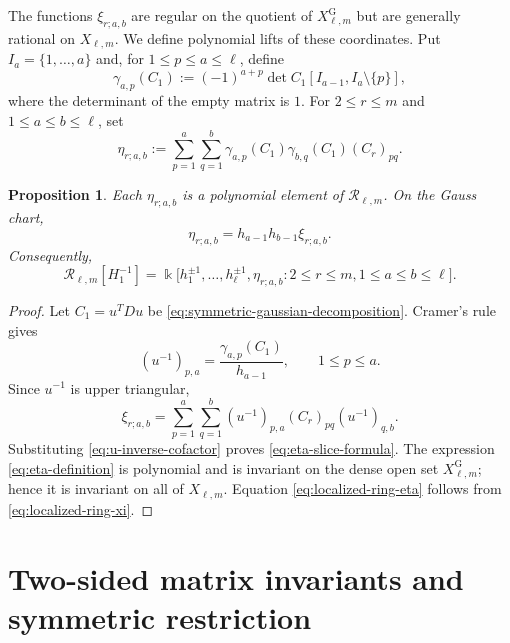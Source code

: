 \documentclass[11pt]{amsart}
\newtheorem{proposition}[theorem]{Proposition}
\theoremstyle{definition}
\theoremstyle{remark}
\newcommand{\kk}{\Bbbk}
\newcommand{\cR}{\mathcal R}
\begin{document}
The functions $\xi_{r;a,b}$ are regular on the quotient of
$X_{\ell,m}^{\mathrm G}$ but are generally rational on $X_{\ell,m}$.  We
define polynomial lifts of these coordinates.  Put $I_a=\{1,\ldots,a\}$ and, for
$1\le p\le a\le\ell$, define
\[ \gamma_{a,p}(C_1) :=(-1)^{a+p}\det C_1[I_{a-1},I_a\setminus\{p\}], \]
where the determinant of the empty matrix is $1$.  For
$2\le r\le m$ and $1\le a\le b\le\ell$, set
\begin{equation}
 \eta_{r;a,b}
 :=\sum_{p=1}^a\sum_{q=1}^b
 \gamma_{a,p}(C_1)\gamma_{b,q}(C_1)(C_r)_{pq}.
 \label{eq:eta-definition}
\end{equation}

\begin{proposition}
\label{prop:eta-gaussian-coordinate}
Each $\eta_{r;a,b}$ is a polynomial element of $\cR_{\ell,m}$.  On the
Gauss chart,
\begin{equation}
 \eta_{r;a,b}=h_{a-1}h_{b-1}\xi_{r;a,b}.
 \label{eq:eta-slice-formula}
\end{equation}
Consequently,
\begin{equation}
 \cR_{\ell,m}[H_1^{-1}]
 =\kk\bigl[
 h_1^{\pm1},\ldots,h_\ell^{\pm1},
 \eta_{r;a,b}:2\le r\le m,
 1\le a\le b\le\ell
 \bigr].
 \label{eq:localized-ring-eta}
\end{equation}
\end{proposition}

\begin{proof}
Let $C_1=u^TDu$ be \eqref{eq:symmetric-gaussian-decomposition}.  Cramer's
rule gives
\begin{equation}
 (u^{-1})_{p,a}=\frac{\gamma_{a,p}(C_1)}{h_{a-1}},
 \qquad 1\le p\le a.
 \label{eq:u-inverse-cofactor}
\end{equation}
Since $u^{-1}$ is upper triangular,
\[ \xi_{r;a,b} =\sum_{p=1}^a\sum_{q=1}^b (u^{-1})_{p,a}(C_r)_{pq}(u^{-1})_{q,b}. \]
Substituting \eqref{eq:u-inverse-cofactor} proves
\eqref{eq:eta-slice-formula}.  The expression
\eqref{eq:eta-definition} is polynomial and is invariant on the dense open
set $X_{\ell,m}^{\mathrm G}$; hence it is invariant on all of
$X_{\ell,m}$.  Equation \eqref{eq:localized-ring-eta} follows from
\eqref{eq:localized-ring-xi}.
\end{proof}


\section{Two-sided matrix invariants and symmetric restriction}
\label{sec:matrix-invariants}
\end{document}
